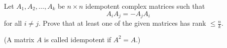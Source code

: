 Let \(A_1,A_2,\ldots,A_k\) be \(n\times n\) idempotent complex matrices such that
\[
A_iA_j = -A_jA_i
\]
for all \(i\ne j\).
Prove that at least one of the given matrices has rank \(\le \frac{n}{k}\).

(A matrix \(A\) is called idempotent if \(A^2=A\).)